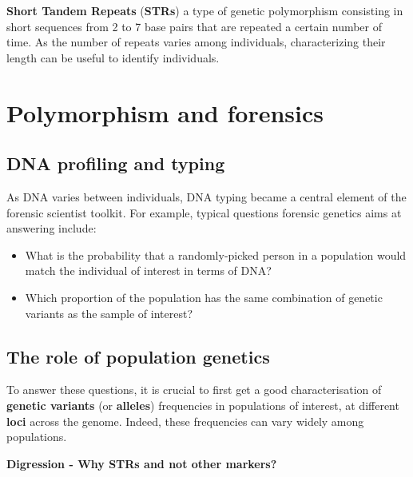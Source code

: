 \documentclass[
]{book}
\begin{document}
\textbf{Short Tandem Repeats} (\textbf{STRs}) a type of genetic polymorphism consisting
in short sequences from 2 to 7 base pairs that are repeated a certain number of time.
As the number of repeats varies among individuals, characterizing their
length can be useful to identify individuals.

\hypertarget{polymorphism-and-forensics}{%
\section*{Polymorphism and forensics}\label{polymorphism-and-forensics}}

\hypertarget{dna-profiling-and-typing}{%
\subsection*{DNA profiling and typing}\label{dna-profiling-and-typing}}

As DNA varies between individuals, DNA typing became a central element of the forensic
scientist toolkit. For example, typical questions forensic genetics aims at
answering include:

\begin{itemize}
\item
  What is the probability that a randomly-picked person in a population would
  match the individual of interest in terms of DNA?
\item
  Which proportion of the population has the same combination of
  genetic variants as the sample of interest?
\end{itemize}

\hypertarget{the-role-of-population-genetics}{%
\subsection*{The role of population genetics}\label{the-role-of-population-genetics}}

To answer these questions, it is crucial to first get a good characterisation
of \textbf{genetic variants} (or \textbf{alleles}) frequencies in populations of interest,
at different \textbf{loci} across the genome. Indeed, these frequencies can vary
widely among populations.

\textbf{Digression - Why STRs and not other markers?}
\end{document}
